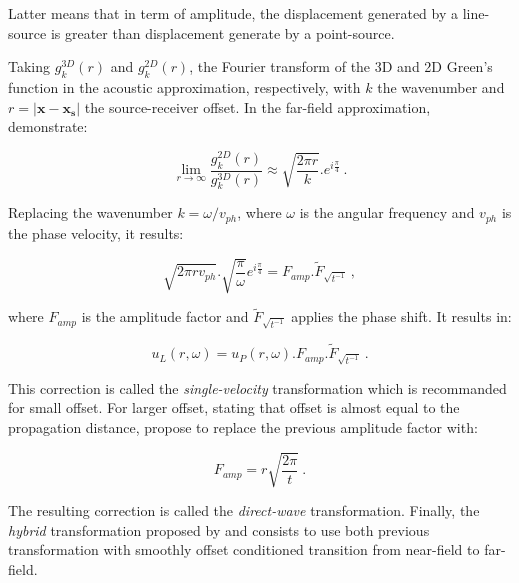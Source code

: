 \documentclass[manuscript,revised]{geophysics}
\begin{document}
\noindent Latter means that in term of amplitude, the displacement generated by a line-source is greater than displacement generate by a point-source.
 
\noindent Taking $g_{k}^{3D}(r)$ and $g_{k}^{2D}(r)$, the Fourier transform of the 3D and 2D Green's function in the acoustic approximation, respectively, with $k$ the wavenumber and $r=|\mathbf{x}-\mathbf{x_{s}}|$ the source-receiver offset. In the far-field approximation, \citet{Forbriger_LSS_2014} demonstrate:

\begin{equation}
	\lim\limits_{r \rightarrow \infty} \frac{g_{k}^{2D}(r)}{g_{k}^{3D}(r)}\approx \sqrt{\frac{2\pi r}{k}}.e^{i\frac{\pi}{4}}\ .
	\label{eq:far-field-frac}
\end{equation}

\noindent Replacing the wavenumber $k=\omega/v_{ph}$, where $\omega$ is the angular frequency and $v_{ph}$ is the phase velocity, it results:

\begin{equation}
	\sqrt{2\pi r v_{ph}}.\sqrt{\frac{\pi}{\omega}}e^{i\frac{\pi}{4}}=F_{amp}.\widetilde{F}_{\sqrt{t^{-1}}}\ ,
\end{equation}

\noindent where $F_{amp}$ is the amplitude factor and $\widetilde{F}_{\sqrt{t^{-1}}}$ applies the phase shift. It results in:

\begin{equation}
	u_{L}(r,\omega)=u_{P}(r,\omega).F_{amp}.\widetilde{F}_{\sqrt{t^{-1}}}\ .
	\label{eq:single-velocity}
\end{equation}

\noindent This correction is called the \textit{single-velocity} transformation which is recommanded for small offset. For larger offset, stating that offset is almost equal to the propagation distance, \citet{Schafer_LSS_2014} propose to replace the previous amplitude factor with:

\begin{equation}
\label{eq:direct-wave}
F_{amp}=r\sqrt{\frac{2 \pi}{t}}\ .
\end{equation}

\noindent The resulting correction is called the \textit{direct-wave} transformation. Finally, the \textit{hybrid} transformation proposed by \citet{Forbriger_LSS_2014} and \citet{Schafer_LSS_2014} consists to use both previous transformation with smoothly offset conditioned transition from near-field to far-field.
\end{document}
